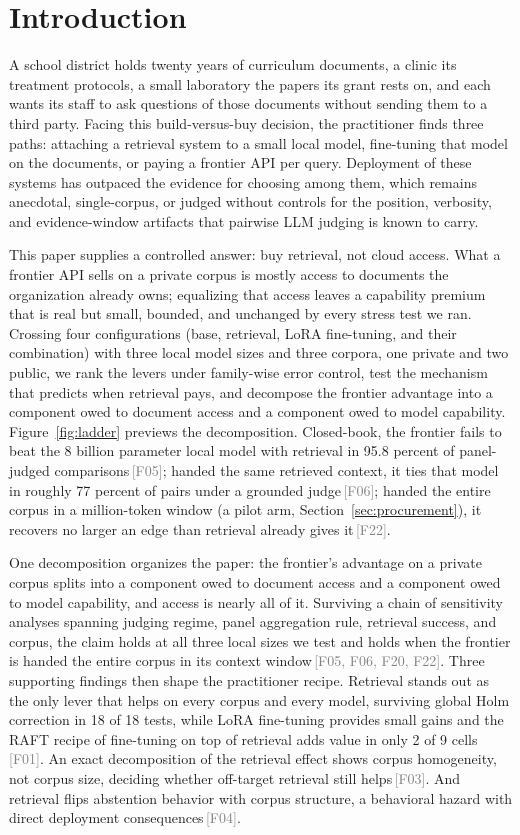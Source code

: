\documentclass[11pt]{article}
\newcommand{\rcpt}[1]{\textcolor{gray}{\,\textsf{\scriptsize[#1]}}}
\begin{document}
\section{Introduction}
\label{sec:intro}

A school district holds twenty years of curriculum documents, a clinic its treatment protocols, a small laboratory the papers its grant rests on, and each wants its staff to ask questions of those documents without sending them to a third party. Facing this build-versus-buy decision, the practitioner finds three paths: attaching a retrieval system to a small local model, fine-tuning that model on the documents, or paying a frontier API per query. Deployment of these systems has outpaced the evidence for choosing among them, which remains anecdotal, single-corpus, or judged without controls for the position, verbosity, and evidence-window artifacts that pairwise LLM judging is known to carry.

This paper supplies a controlled answer: buy retrieval, not cloud access. What a frontier API sells on a private corpus is mostly access to documents the organization already owns; equalizing that access leaves a capability premium that is real but small, bounded, and unchanged by every stress test we ran. Crossing four configurations (base, retrieval, LoRA fine-tuning, and their combination) with three local model sizes and three corpora, one private and two public, we rank the levers under family-wise error control, test the mechanism that predicts when retrieval pays, and decompose the frontier advantage into a component owed to document access and a component owed to model capability. Figure~\ref{fig:ladder} previews the decomposition. Closed-book, the frontier fails to beat the 8 billion parameter local model with retrieval in 95.8 percent of panel-judged comparisons\rcpt{F05}; handed the same retrieved context, it ties that model in roughly 77 percent of pairs under a grounded judge\rcpt{F06}; handed the entire corpus in a million-token window (a pilot arm, Section~\ref{sec:procurement}), it recovers no larger an edge than retrieval already gives it\rcpt{F22}.

One decomposition organizes the paper: the frontier's advantage on a private corpus splits into a component owed to document access and a component owed to model capability, and access is nearly all of it. Surviving a chain of sensitivity analyses spanning judging regime, panel aggregation rule, retrieval success, and corpus, the claim holds at all three local sizes we test and holds when the frontier is handed the entire corpus in its context window\rcpt{F05, F06, F20, F22}. Three supporting findings then shape the practitioner recipe. Retrieval stands out as the only lever that helps on every corpus and every model, surviving global Holm correction in 18 of 18 tests, while LoRA fine-tuning provides small gains and the RAFT recipe of fine-tuning on top of retrieval adds value in only 2 of 9 cells\rcpt{F01}. An exact decomposition of the retrieval effect shows corpus homogeneity, not corpus size, deciding whether off-target retrieval still helps\rcpt{F03}. And retrieval flips abstention behavior with corpus structure, a behavioral hazard with direct deployment consequences\rcpt{F04}.
\end{document}

